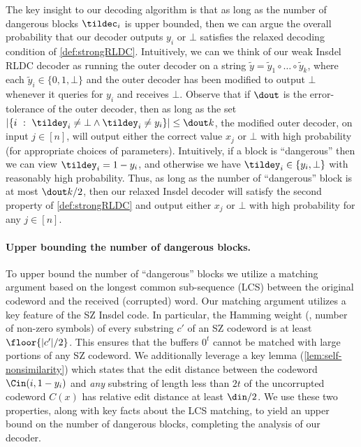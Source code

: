 The key insight to our decoding algorithm is that as long as the number of dangerous blocks $\tildec_i$ is upper bounded, then we can argue the overall probability that our decoder outputs $y_i$ or $\bot$ satisfies the relaxed decoding condition of \cref{def:strongRLDC}.
Intuitively, we can we think of our weak Insdel RLDC decoder as running the outer decoder on a string $\tilde{y} = \tilde{y}_1 \circ \ldots \circ \tilde{y}_k$, where each $\tilde{y}_i \in \{0,1,\bot\}$ and the outer decoder has been modified to output $\bot$ whenever it queries for $y_i$ and receives $\bot$. 
Observe that if $\dout$ is the error-tolerance of the outer decoder, then as long as the set $\left| \{ i ~:~\tildey_i \neq \bot \wedge \tildey_i \neq y_i \} \right| \leq \dout k$, the modified outer decoder, on input $j \in [n]$, will output either the correct value $x_j$ or $\bot$ with high probability %
(for appropriate choices of parameters). 
Intuitively, if a block is ``dangerous'' then we can view $\tildey_i = 1- y_i$, and otherwise we have $\tildey_i \in \{y_i, \bot\}$ with reasonably high probability. 
Thus, as long as the number of ``dangerous'' block is at most $\dout k/2$, then our relaxed Insdel decoder will satisfy the second property of \cref{def:strongRLDC} and output either $x_j$ or $\bot$ with high probability %
for any $j \in [n]$.

\paragraph{Upper bounding the number of dangerous blocks.}
To upper bound the number of ``dangerous'' blocks we utilize a matching argument based on the longest common sub-sequence (LCS) between the original codeword and the received (corrupted) word. 
Our matching argument utilizes a key feature of the SZ Insdel code. 
In particular, the Hamming weight (\ie, number of non-zero symbols) of every substring $c'$ of an SZ codeword is at least $\floor{|c'|/2}$. %
This ensures that the buffers $0^t$ cannot be matched with large portions of any SZ codeword. 
We additionally leverage a key lemma (\cref{lem:self-nonsimilarity}) which states that the edit distance between the codeword $\Cin(i,1-y_i)$ and \emph{any} substring of length less than $2t$ of the uncorrupted codeword $C(x)$ has relative edit distance at least $\din/2$.
We use these two properties, along with key facts about the LCS matching, to yield an upper bound on the number of dangerous blocks, completing the analysis of our decoder.

